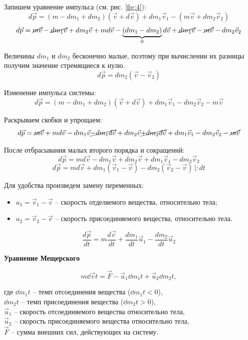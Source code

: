 Запишем уравнение импульса (см. рис. \ref{fig:4}):
\[d\vec{p} = (m - dm_1 + dm_2)(\vec{v} + d\vec{v}) + dm_1\vec{v}_1 - (m\vec{v} + dm_2 \vec{v}_2)\]
\[d\vec{p} = \cancel{m\vec{v}} - \cancel{dm_1\vec{v}} + dm_2\vec{v} + md\vec{v} - \underbrace{(dm_1 - dm_2)}_{0}d\vec{v}  + \cancel{dm_1 \vec{v}} - \cancel{m\vec{v}} - dm_2 \vec{v}_2\]

Величины $dm_1$ и $dm_2$ бесконечно малые, поэтому при вычислении их разницы получим значение стремящиеся к нулю.
\[d\vec{p} = dm_2(\vec{v} - \vec{v}_2)\]

Изменение импульса системы:
\[ d\vec{p} = (m - dm_1 + dm_2)(\vec{v} + d\vec{v}) + dm_1\vec{v}_1 - dm_2\vec{v}_2 - m\vec{v} \]

Раскрываем скобки и упрощаем:
\[ d\vec{p} = \cancel{m\vec{v}} + md\vec{v} - dm_1\vec{v} \cancel{- dm_1d\vec{v}} + dm_2\vec{v} \cancel{+ dm_2d\vec{v}} + dm_1\vec{v}_1 - dm_2\vec{v}_2 - \cancel{m\vec{v}} \]

После отбрасывания малых второго порядка и сокращений:
\[ d\vec{p} = md\vec{v} - dm_1\vec{v} + dm_2\vec{v} + dm_1\vec{v}_1 - dm_2\vec{v}_2\]
\[\boxed{d\vec{p} = md\vec{v} + dm_1(\vec{v}_1 - \vec{v}) - dm_2(\vec{v}_2 - \vec{v})} \, \Big|:dt \]

Для удобства произведем замену переменных:
\begin{itemize}
	\item $u_1 = \vec{v}_1 - \vec{v}$ -- скорость отделяемого вещества, относительно тела;
	\item $u_2 = \vec{v}_2 - \vec{v}$ -- скорость присоединяемого вещества, относительно тела.
\end{itemize}
\[ \boxed{\frac{d\vec{p}}{dt} = m\frac{d\vec{v}}{dt} + \frac{dm_1}{dt}\vec{u}_1 - \frac{dm_2}{dt}\vec{u}_2} \]

\begin{center}
	\textbf{Уравнение Мещерского}
\end{center}
\[\boxed{m \dd{\vec{v}}{t} = \vec{F} - \vec{u}_1 \dd{m_1}{t} + \vec{u}_2 \dd{m_2}{t}},\]
\begin{center}
	где $\dd{m_1}{t}$ -- темп отсоединения вещества ($\dd{m_1}{t} < 0$), \\
	$\dd{m_2}{t}$ -- темп присоединения вещества ($\dd{m_2}{t} > 0$), \\
	$\vec{u}_1$ -- скорость отсоединяемого вещества относительно тела, \\
	$\vec{u}_2$ -- скорость присоединяемого вещества относительно тела, \\
	$\vec{F}$ -- сумма внешних сил, действующих на систему.
\end{center}

